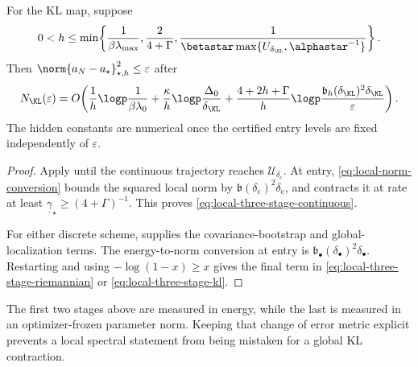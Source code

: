 \begin{theorem}
For the KL map, suppose
\[
  0<h\leq\min\!\left\{
    \frac1{\beta\lambda_{\max}},
    \frac2{4+\Gamma},
    \frac1{\betastar
      \max\{U_{\delta_{\KL}},\alphastar^{-1}\}}
  \right\}.
\]
Then \(\norm{a_N-a_\star}_{\star,h}^2\leq\varepsilon\) after
\begin{equation}
  N_{\KL}(\varepsilon)
  =O\!\left(
    \frac1h\logp\frac1{\beta\lambda_0}
    +\frac\kappa h\logp\frac{\Delta_0}{\delta_{\KL}}
    +\frac{4+2h+\Gamma}{h}
       \logp\frac{\mathfrak b_h(\delta_{\KL})^2
                        \delta_{\KL}}{\varepsilon}
  \right).
  \label{eq:local-three-stage-kl}
\end{equation}
The hidden constants are numerical once the certified entry levels are
fixed independently of \(\varepsilon\).
\end{theorem}

\begin{proof}
Apply  until the continuous trajectory
reaches \(\mathcal U_{\delta_{\mathrm c}}\).  At entry,
\eqref{eq:local-norm-conversion} bounds the squared local norm by
\(\mathfrak b(\delta_{\mathrm c})^2\delta_{\mathrm c}\), and
 contracts it at rate at least
\(\underline\gamma_\star\geq(4+\Gamma)^{-1}\).  This proves
\eqref{eq:local-three-stage-continuous}.

For either discrete scheme,  supplies the
covariance-bootstrap and global-localization terms.  The energy-to-norm
conversion at entry is \(\mathfrak b_\bullet(\delta_\bullet)^2
\delta_\bullet\).  Restarting
 and using
\(-\log(1-x)\geq x\) gives the final term in
\eqref{eq:local-three-stage-riemannian} or
\eqref{eq:local-three-stage-kl}.
\end{proof}

The first two stages above are measured in energy, while the last is measured
in an optimizer-frozen parameter norm.  Keeping that change of error metric
explicit prevents a local spectral statement from being mistaken for a
global KL contraction.
